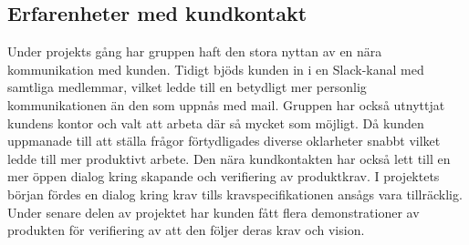 \subsection{Erfarenheter med kundkontakt}
Under projekts gång har gruppen haft den stora nyttan av en nära kommunikation med kunden. Tidigt bjöds kunden in i en Slack-kanal med samtliga medlemmar, vilket ledde till en betydligt mer personlig kommunikationen än den som uppnås med mail. Gruppen har också utnyttjat kundens kontor och valt att arbeta där så mycket som möjligt. Då kunden uppmanade till att ställa frågor förtydligades diverse oklarheter snabbt vilket ledde till mer produktivt arbete. Den nära kundkontakten har också lett till en mer öppen dialog kring skapande och verifiering av produktkrav. I projektets början fördes en dialog kring krav tills kravspecifikationen ansågs vara tillräcklig. Under senare delen av projektet har kunden fått flera demonstrationer av produkten för verifiering av att den följer deras krav och vision.




